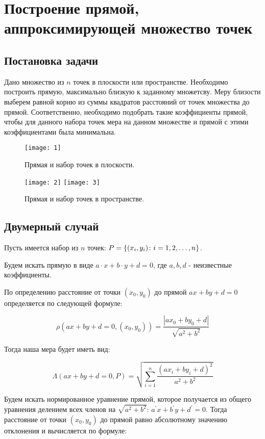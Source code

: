 \section{Построение прямой, аппроксимирующей множество точек}\label{line}

\subsection{Постановка задачи}\label{line:task}

Дано множество из $n$ точек в плоскости или пространстве. Необходимо построить прямую, максимально близкую к заданному множетсву. Меру близости выберем равной корню из суммы квадратов расстояний от точек множества до прямой. Соответственно, необходимо подобрать такие коэффициенты прямой, чтобы для данного набора точек мера на данном множестве и прямой с этими коэффициентами была минимальна.

\begin{figure}[h]
	{ \noindent \centering
	\texttt{[image: 1]}
	\caption{Прямая и набор точек в плоскости.}
	}
\end{figure}

\begin{figure}[h]
	{ \noindent \centering
	\texttt{[image: 2]}
	\texttt{[image: 3]}
	\caption{Прямая и набор точек в пространстве.}
	}
\end{figure}

\newpage
\subsection{Двумерный случай}\label{line:alg:2dim}

Пусть имеется набор из $n$ точек: $P = \left\{(x_i, y_i)\colon i=1,2,\dots,n\right\}$. 

Будем искать прямую в виде $a \cdot x + b \cdot y + d = 0$, где $a, b, d$ - неизвестные коэффициенты.

По определению расстояние от точки $(x_0, y_0)$ до прямой $ax+by+d=0$ определяется по следующей формуле:

$$\rho (ax+by+d=0, (x_0, y_0)) = \frac{|ax_0+by_0+d|}{\sqrt{a^2+b^2}}$$

Тогда наша мера будет иметь вид:

$$\Lambda (ax+by+d=0,P)=\sqrt{\sum_{i=1}^{n} \frac{(ax_i+by_i+d)^2}{a^2+b^2}}$$

Будем искать нормированное уравнение прямой, которое получается из общего уравнения делением всех членов на $\sqrt{a^2+b^2}$: $a^{'}x+b^{'}y+d^{'}=0$. Тогда расстояние от точки $(x_0,y_0)$ до прямой равно абсолютному значению отклонения и вычисляется по формуле: 

